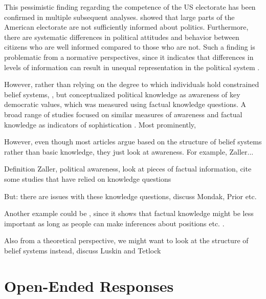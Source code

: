 \documentclass[12pt]{article}
\begin{document}
This pessimistic finding regarding the competence of the US electorate has been confirmed in multiple subsequent analyses. \citet{carpini1996americans} showed that large parts of the American electorate are not sufficiently informed about politics. Furthermore, there are systematic differences in political attitudes and behavior between citizens who are well informed compared to those who are not. Such a finding is problematic from a normative perspectives, since it indicates that differences in levels of information can result in unequal representation in the political system \citep[see also][]{althaus1998information,kuklinski2000misinformation,gilens2001political}.

However, rather than relying on the degree to which individuals hold constrained belief systems, \citet{carpini1996americans}, but conceptualized political knowledge as awareness of key democratic values, which was measured using factual knowledge questions. A broad range of studies focused on similar measures of awareness and factual knowledge as indicators of sophistication \citep[e.g.][]{gomez2001political}. Most prominently, \citet{zaller1992nature}

However, even though most articles argue based on the structure of belief systems rather than basic knowledge, they just look at awareness. For example, Zaller...

Definition Zaller, political awareness, look at pieces of factual information, cite some studies that have relied on knowledge questions

But: there are issues with these knowledge questions, discuss Mondak, Prior etc.

Another example could be \citet{lupia1994shortcuts}, since it shows that factual knowledge might be less important as long as people can make inferences about positions etc. \citep[see also][]{lupia2006elitism}.

Also from a theoretical perspective, we might want to look at the structure of belief systems instead, discuss Luskin and Tetlock


\section{Open-Ended Responses}
\end{document}
